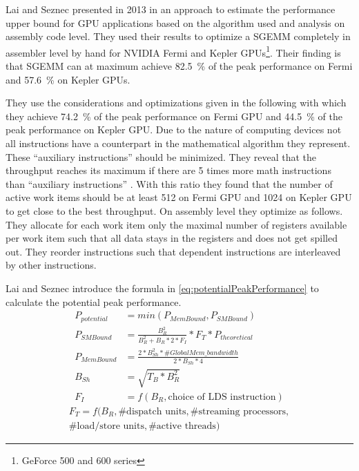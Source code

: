 Lai and Seznec presented in 2013 in \cite{Lai2013} an approach to estimate the 
performance upper 
bound for \ac{GPU} applications based on the algorithm used and analysis on 
assembly code level. They used their results to optimize a \ac{SGEMM} 
completely in assembler level by hand for NVIDIA Fermi and Kepler 
\acp{GPU}\footnote{GeForce 500 and 600 series}. 
Their finding is that \ac{SGEMM} can at maximum achieve \SI{82.5}{\percent} of 
the peak performance on Fermi and \SI{57.6}{\percent} on Kepler \acp{GPU}.

They use the considerations and optimizations given in the following with which 
they achieve \SI{74.2}{\percent} of the peak performance on Fermi \ac{GPU} and 
\SI{44.5}{\percent} of the peak performance on Kepler \ac{GPU}. Due to the 
nature of computing devices not all instructions have a counterpart in the 
mathematical algorithm they represent. These ``auxiliary instructions'' 
\cite[Section 4.1]{Lai2013} should be minimized. They reveal that the 
throughput 
reaches its maximum if there are 5 times more math instructions than 
``auxiliary instructions'' \cite[Figure 2]{Lai2013}. With this ratio they found 
that the number of active work items should be at least 512 on Fermi \ac{GPU} 
and 1024 on Kepler \ac{GPU} to get close to the best throughput. On assembly 
level they optimize as follows. They allocate for each work item only the 
maximal number of registers available per work item such that all data stays in 
the registers and does not get spilled out. They reorder instructions such that 
dependent instructions are interleaved by other instructions.

Lai and Seznec introduce the formula in \cref{eq:potentialPeakPerformance} to 
calculate the potential peak performance.
\begin{align}
\label{eq:potentialPeakPerformance}
P_{potential} &= min(P_{MemBound},P_{SMBound}) \\
P_{SMBound} &= \frac{B_R^2}{B_R^2 + B_R * 2 * F_I} * F_T * P_{theoretical} \\
P_{MemBound} &= \frac{2 * B_{Sh}^2 * \#{GlobalMem\_bandwidth}}{2 * B_{Sh} * 4} 
\\
B_{Sh} &= \sqrt{T_B * B_R^2} \\
F_I &= f(B_R, \text{choice of LDS instruction})
\end{align}
\begin{multline}
F_T = f(B_R,\text{\# dispatch units},\text{\# streaming processors},\\ 
    \text{\# load/store units}, \text{\# active threads}) 
\end{multline}

